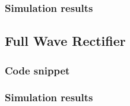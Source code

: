 \documentclass[12pt]{article}
\begin{document}
\subsubsection{Simulation results}

\subsection{Full Wave Rectifier}
\subsubsection{Code snippet}

\subsubsection{Simulation results}
\end{document}
